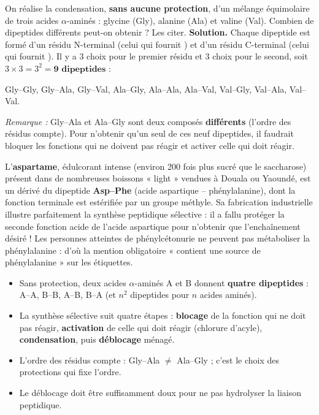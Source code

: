 \documentclass[11pt]{article}
\begin{document}
\begin{exoresolu}
On réalise la condensation, \textbf{sans aucune protection}, d'un mélange équimolaire de trois acides $\alpha$-aminés : glycine (Gly), alanine (Ala) et valine (Val). Combien de dipeptides différents peut-on obtenir ? Les citer.
\tcblower
\textbf{Solution.} Chaque dipeptide est formé d'un résidu N-terminal (celui qui fournit ) et d'un résidu C-terminal (celui qui fournit ). Il y a 3 choix pour le premier résidu et 3 choix pour le second, soit $3 \times 3 = 3^2 = \textbf{9 dipeptides}$ :
\begin{center}
Gly--Gly, Gly--Ala, Gly--Val, Ala--Gly, Ala--Ala, Ala--Val, Val--Gly, Val--Ala, Val--Val.
\end{center}
\emph{Remarque :} Gly--Ala et Ala--Gly sont deux composés \textbf{différents} (l'ordre des résidus compte). Pour n'obtenir qu'un seul de ces neuf dipeptides, il faudrait bloquer les fonctions qui ne doivent pas réagir et activer celle qui doit réagir.
\end{exoresolu}

\begin{savaistu}
L'\textbf{aspartame}, édulcorant intense (environ 200 fois plus sucré que le saccharose) présent dans de nombreuses boissons « light » vendues à Douala ou Yaoundé, est un dérivé du dipeptide \textbf{Asp--Phe} (acide aspartique -- phénylalanine), dont la fonction  terminale est estérifiée par un groupe méthyle. Sa fabrication industrielle illustre parfaitement la synthèse peptidique sélective : il a fallu protéger la seconde fonction acide de l'acide aspartique pour n'obtenir que l'enchaînement désiré ! Les personnes atteintes de phénylcétonurie ne peuvent pas métaboliser la phénylalanine : d'où la mention obligatoire « contient une source de phénylalanine » sur les étiquettes.
\end{savaistu}

\begin{aretenir}
\begin{itemize}
\item Sans protection, deux acides $\alpha$-aminés A et B donnent \textbf{quatre dipeptides} : A--A, B--B, A--B, B--A (et $n^2$ dipeptides pour $n$ acides aminés).
\item La synthèse sélective suit quatre étapes : \textbf{blocage} de la fonction qui ne doit pas réagir, \textbf{activation} de celle qui doit réagir (chlorure d'acyle), \textbf{condensation}, puis \textbf{déblocage} ménagé.
\item L'ordre des résidus compte : Gly--Ala $\neq$ Ala--Gly ; c'est le choix des protections qui fixe l'ordre.
\item Le déblocage doit être suffisamment doux pour ne pas hydrolyser la liaison peptidique.
\end{itemize}
\end{aretenir}
\end{document}
